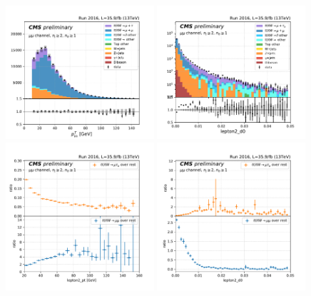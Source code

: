  \begin{figure}[h]
  \centering
  \includegraphics[width=0.49\textwidth]{chapters/Analysis/sectionPlots/figures/kinematics_pickles/mumu/12b/mumu_2b_lepton2_pt.pdf}
  \includegraphics[width=0.49\textwidth]{chapters/Analysis/sectionSelection/figures/sob/mumu_lepton2_d0_logscale.pdf}
  \includegraphics[width=0.49\textwidth]{chapters/Analysis/sectionSelection/figures/sob/mumu_lepton2_pt_2.pdf} 
  \includegraphics[width=0.49\textwidth]{chapters/Analysis/sectionSelection/figures/sob/mumu_lepton2_d0_2.pdf} 

\end{figure}
